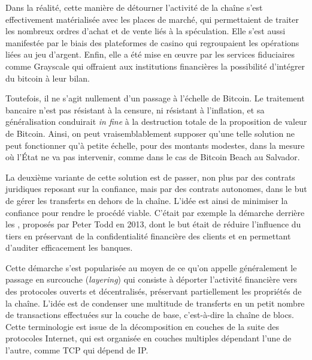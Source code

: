Dans la réalité, cette manière de détourner l'activité de la chaîne s'est effectivement matérialisée avec les places de marché, qui permettaient de traiter les nombreux ordres d'achat et de vente liés à la spéculation. Elle s'est aussi manifestée par le biais des plateformes de casino qui regroupaient les opérations liées au jeu d'argent. Enfin, elle a été mise en œuvre par les services fiduciaires comme Grayscale qui offraient aux institutions financières la possibilité d'intégrer du bitcoin à leur bilan.

Toutefois, il ne s'agit nullement d'un passage à l'échelle de Bitcoin. Le traitement bancaire n'est pas résistant à la censure, ni résistant à l'inflation, et sa généralisation conduirait \emph{in fine} à la destruction totale de la proposition de valeur de Bitcoin. Ainsi, on peut vraisemblablement supposer qu'une telle solution ne peut fonctionner qu'à petite échelle, pour des montants modestes, dans la mesure où l'État ne va pas intervenir, comme dans le cas de Bitcoin Beach au Salvador.

La deuxième variante de cette solution est de passer, non plus par des contrats juridiques reposant sur la confiance, mais par des contrats autonomes, dans le but de gérer les transferts en dehors de la chaîne. L'idée est ainsi de minimiser la confiance pour rendre le procédé viable. C'était par exemple la démarche derrière les , proposés par Peter Todd en 2013, dont le but était de réduire l'influence du tiers en préservant de la confidentialité financière des clients et en permettant d'auditer efficacement les banques.

Cette démarche s'est popularisée au moyen de ce qu'on appelle généralement le passage en surcouche (\emph{layering}) qui consiste à déporter l'activité financière vers des protocoles ouverts et décentralisés, préservant partiellement les propriétés de la chaîne. L'idée est de condenser une multitude de transferts en un petit nombre de transactions effectuées sur la couche de base, c'est-à-dire la chaîne de blocs. Cette terminologie est issue de la décomposition en couches de la suite des protocoles Internet, qui est organisée en couches multiples dépendant l'une de l'autre, comme TCP qui dépend de IP. %

